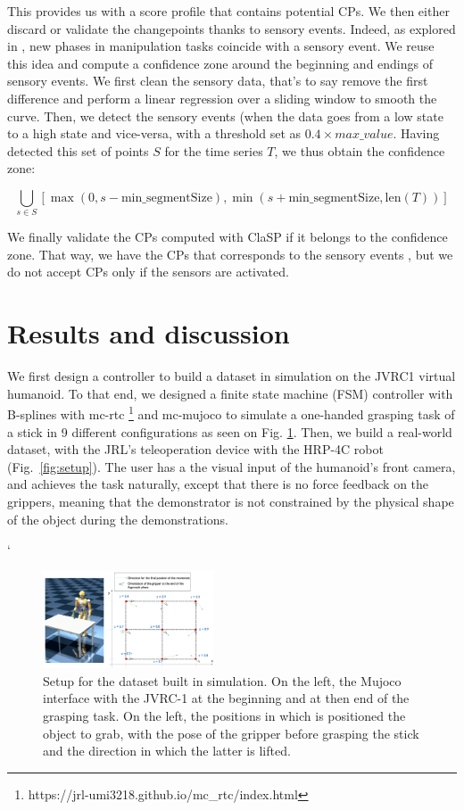 \documentclass[conference]{IEEEtran}
\begin{document}
This provides us with a score profile that contains potential CPs. We then either discard or validate the changepoints thanks to sensory events. Indeed, as explored in \cite{sensory_seg}, new phases in manipulation tasks coincide  with a sensory event. We reuse this idea and compute a confidence zone around the beginning and endings of sensory events. We first clean the sensory data, that's to say remove the first difference and perform a linear regression over a sliding window to smooth the curve. Then,  we detect the sensory events  (when the data goes from a low state to a high  state and vice-versa, with a threshold set as $0.4\times max\_value$. Having detected this set of points $S$ for the time series $T$, we thus obtain the confidence zone:

\begin{equation}
        \bigcup_{s \in S} \left[ \max(0, s - \text{min\_segmentSize}),\min(s + \text{min\_segmentSize}, \text{len}(T)) \right]
\end{equation}

We finally validate the CPs computed with ClaSP if it belongs to the confidence zone. That way, we have the CPs that corresponds to the sensory events , but we do not accept CPs only if the sensors are activated.

\section{Results and discussion} \label{results}

 We first design a controller to build a dataset in  simulation on the JVRC1 virtual humanoid. To that end, we designed a finite state machine (FSM) controller with B-splines with mc-rtc \footnote{https://jrl-umi3218.github.io/mc\_rtc/index.html} and mc-mujoco \cite{singh2023mc} to simulate a one-handed grasping task of a stick in 9 different configurations as seen on Fig. \ref{fig:simSetup}. Then, we build a real-world dataset, with the JRL's teleoperation device  with the HRP-4C robot (Fig.~\ref{fig:setup}). The user has a the visual input of the humanoid's front camera, and achieves the task naturally, except that there is no force  feedback on the grippers, meaning that the demonstrator is not constrained by the physical shape of the object during the demonstrations.

 `\begin{figure}[ht]
  \centering
  \includegraphics[width=0.45\textwidth]{img/simSetup5.png}
  \caption{Setup for the dataset built in simulation. On the left, the Mujoco interface with the JVRC-1 \cite{jvrc} at the beginning and at then end of the grasping task. On the left, the positions in which is positioned the object to grab, with the pose of the gripper before grasping the stick and the direction in which the latter is lifted.}
  \label{fig:simSetup}
\end{figure}
\end{document}
